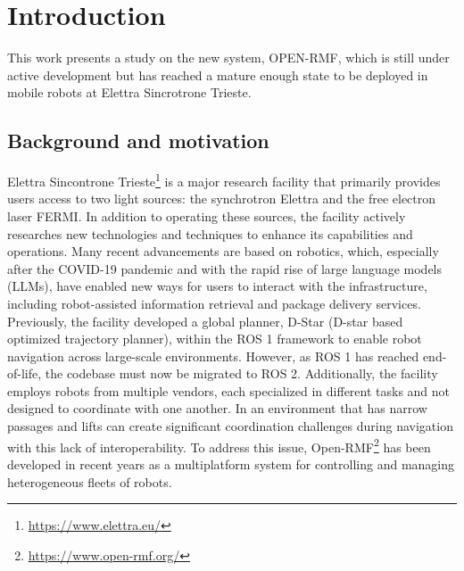 \part{Introduction}
This work presents a study on the new system, OPEN-RMF, which is still under active development but has reached a mature enough state to be deployed in mobile robots at Elettra Sincrotrone Trieste.
\chapter{Background and motivation}
Elettra Sincontrone Trieste\footnote{\href{https://www.elettra.eu/}{https://www.elettra.eu/}} is a major research facility that primarily provides users access to two light sources: the synchrotron Elettra and the free electron laser FERMI.
In addition to operating these sources, the facility actively researches new technologies and techniques to enhance its capabilities and operations. Many recent advancements are based on robotics, which, especially after the COVID-19 pandemic and with the rapid rise of large language models (LLMs), have enabled new ways for users to interact with the infrastructure, including robot-assisted information retrieval and package delivery services.
Previously, the facility developed a global planner, D-Star (D-star based optimized trajectory planner)\cite{10.1007/978-3-031-45770-8_29}, within the ROS 1 framework to enable robot navigation across large-scale environments.  However, as ROS 1 has reached end-of-life, the codebase must now be migrated to ROS 2.
Additionally, the facility employs robots from multiple vendors, each specialized in different tasks and not designed to coordinate with one another.
\alert{In an environment that has narrow passages and lifts can create significant coordination challenges during navigation with this lack of interoperability.}
To address this issue,  Open-RMF\footnote{\href{https://www.open-rmf.org/}{https://www.open-rmf.org/}} has been developed in recent years as a multiplatform system for controlling and managing heterogeneous fleets of robots.
